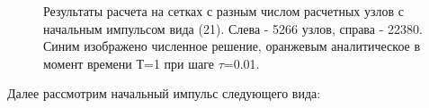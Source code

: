 \documentclass[14pt]{article}
\begin{document}
\begin{figure}[H]
\caption{Результаты расчета на сетках с разным числом расчетных узлов с начальным импульсом вида (21). Слева - 5266 узлов, справа - 22380. Синим изображено численное решение, оранжевым аналитическое в момент времени Т=1 при шаге $\tau$=0.01.}
\end{figure}
\newpage
Далее рассмотрим начальный импульс следующего вида:
\end{document}
